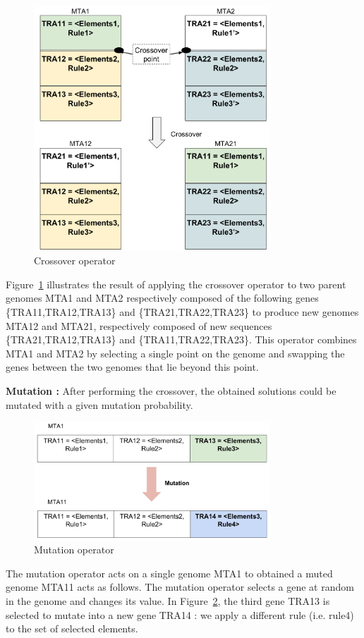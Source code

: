 \documentclass[conference]{IEEEtran}
\begin{document}
\begin{figure}[!ht]
\centering
\includegraphics[width=3.49in]{crossover.pdf}
\caption{Crossover operator}
\label{crossover}
\end{figure}

Figure~\ref{crossover} illustrates the result of applying the crossover operator to two parent genomes MTA1 and MTA2 respectively composed of the following genes \{TRA11,TRA12,TRA13\} and \{TRA21,TRA22,TRA23\} to produce new genomes MTA12 and MTA21, respectively composed of new sequences \{TRA21,TRA12,TRA13\} and \{TRA11,TRA22,TRA23\}. This operator combines MTA1 and MTA2 by selecting a single point on the genome and swapping the genes between the two genomes that lie beyond this point.

\textbf{Mutation :}
After performing the crossover, the obtained solutions could be mutated with a given mutation probability.

\begin{figure}[!ht]
\centering
\includegraphics[width=3.49in]{mutation.pdf}
\caption{Mutation operator}
\label{mutation}
\end{figure}

The mutation operator acts on a single genome MTA1 to obtained a muted genome MTA11 acts as follows. The mutation operator selects a gene at random in the genome and changes its value. In Figure~\ref{mutation}, the third gene TRA13 is selected to mutate into a new gene TRA14 : we apply a different rule (i.e. rule4) to the set of selected elements.
\end{document}
